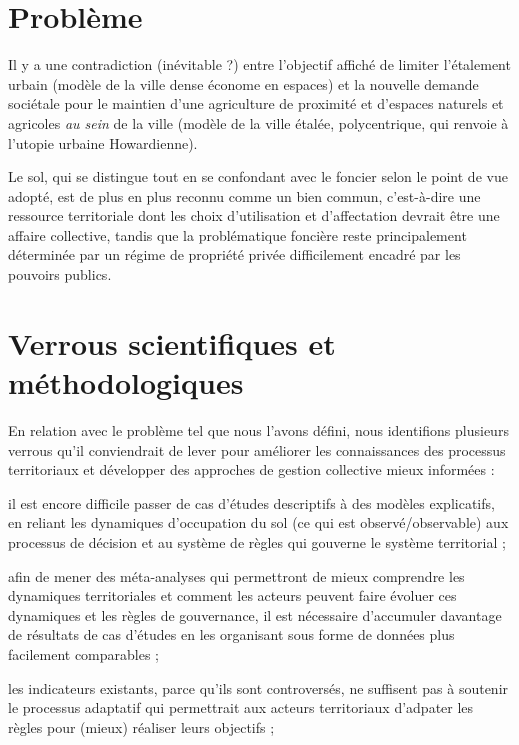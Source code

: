 \section{Problème}

Il y a une contradiction (inévitable ?) entre l'objectif affiché de limiter
l'étalement urbain (modèle de la ville dense économe en espaces)
et la nouvelle demande sociétale pour le maintien d'une agriculture de proximité
et d'espaces naturels et agricoles {\it au sein} de la ville
(modèle de la ville étalée, polycentrique,
qui renvoie à l'utopie urbaine Howardienne).

Le sol, qui se distingue tout en se confondant avec le foncier
selon le point de vue adopté, est de plus en plus reconnu
comme un bien commun, c'est-à-dire une ressource territoriale
dont les choix d'utilisation et d'affectation devrait être une affaire collective,
tandis que la problématique foncière reste principalement déterminée
par un régime de propriété privée difficilement encadré par les
pouvoirs publics.


\section{Verrous scientifiques et méthodologiques}

En relation avec le problème tel que nous l'avons défini,
nous identifions plusieurs verrous qu'il conviendrait
de lever pour améliorer les connaissances des processus territoriaux
et développer des approches de gestion collective mieux informées :

\startitemize[n]

\item il est encore difficile passer de cas d'études descriptifs
	à des modèles explicatifs, en reliant les dynamiques d'occupation du sol
	(ce qui est observé/observable) aux processus de décision et
	au système de règles qui gouverne le système territorial ;

\item afin de mener des méta-analyses qui permettront de mieux comprendre
	les dynamiques territoriales et comment les acteurs peuvent faire évoluer
	ces dynamiques et les règles de gouvernance,
	il est nécessaire d'accumuler davantage de résultats de cas d'études
	en les organisant sous forme de données plus facilement comparables ;

\item les indicateurs existants, parce qu'ils sont controversés,
	ne suffisent pas à soutenir le processus adaptatif
	qui permettrait aux acteurs territoriaux
	d'adpater les règles pour (mieux) réaliser leurs objectifs ;

